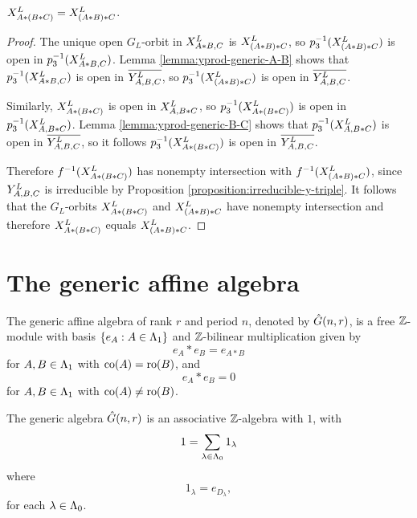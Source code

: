 \documentclass[a4paper, 11pt]{report}
\begin{document}
\begin{proposition}\label{proposition:associativity}
$\xprod[L]{A\ast (B\ast C)} = \xprod[L]{(A\ast B)\ast C}$.
\end{proposition}

\begin{proof}
The unique open $G_L$-orbit in $\xprod[L]{A\ast B, C}$ is $\xprod[L]{(A\ast B)\ast C}$, so $p_3^{-1}(\xprod[L]{(A\ast B)\ast C})$ is open in $p_3^{-1}(\xprod[L]{A\ast B,C})$. Lemma \ref{lemma:yprod-generic-A-B} shows that $p_3^{-1}(\xprod[L]{A\ast B,C})$ is open in $\overline{\yprod[L]{A,B,C}}$, so $p_3^{-1}(\xprod[L]{(A\ast B)\ast C})$ is open in $\overline{\yprod[L]{A,B,C}}$.

Similarly, $\xprod[L]{A\ast (B\ast C)}$ is open in $\xprod[L]{A,B\ast C}$, so $p_3^{-1}(\xprod[L]{A\ast (B\ast C)})$ is open in $p_3^{-1}(\xprod[L]{A,B\ast C})$. Lemma \ref{lemma:yprod-generic-B-C} shows that $p_3^{-1}(\xprod[L]{A,B\ast C})$ is open in $\overline{\yprod[L]{A,B,C}}$, so it follows $p_3^{-1}(\xprod[L]{A\ast (B\ast C)})$ is open in $\overline{\yprod[L]{A,B,C}}$.

Therefore $f^{-1}(\xprod[L]{A\ast (B\ast C)})$ has nonempty intersection with $f^{-1}(\xprod[L]{(A\ast B)\ast C})$, since $\yprod[L]{A,B,C}$ is irreducible by Proposition \ref{proposition:irreducible-y-triple}. It follows that the $G_L$-orbits $\xprod[L]{A\ast (B\ast C)}$ and $\xprod[L]{(A\ast B)\ast C}$ have nonempty intersection and therefore $\xprod[L]{A\ast (B\ast C)}$ equals $\xprod[L]{(A\ast B)\ast C}$.
\end{proof}


\section{The generic affine algebra}

The generic affine algebra of rank $r$ and period $n$, denoted by $\generic$, is a free $\integers$-module with basis $\{e_A:A\in\matrices\}$ and $\integers$-bilinear multiplication given by
\begin{equation*}
e_A\ast e_B = e_{A\ast B}
\end{equation*}
for $A,B\in\matrices$ with $\co{A}=\ro{B}$, and
\begin{equation*}
e_A\ast e_B = 0
\end{equation*}
for $A,B\in\matrices$ with $\co{A}\neq\ro{B}$.

\begin{proposition}
The generic algebra $\generic$ is an associative $\integers$-algebra with $1$, with
\begin{equation*}
1=\sum_{\lambda\in\compositions} 1_\lambda
\end{equation*}
where
\begin{equation*}
1_\lambda = e_{D_\lambda},
\end{equation*}
for each $\lambda\in\compositions$.
\end{proposition}
\end{document}
